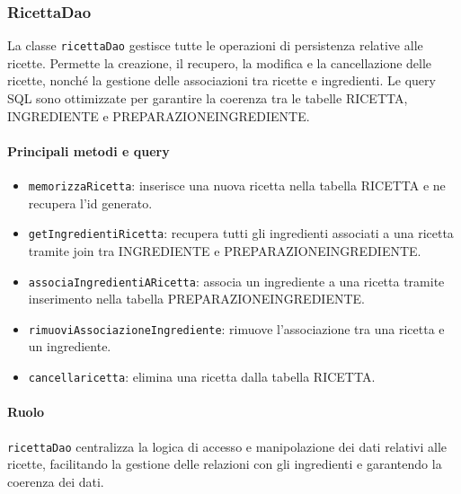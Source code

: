 \subsubsection{RicettaDao}
La classe \texttt{ricettaDao} gestisce tutte le operazioni di persistenza relative alle ricette. Permette la creazione, il recupero, la modifica e la cancellazione delle ricette, nonché la gestione delle associazioni tra ricette e ingredienti. Le query SQL sono ottimizzate per garantire la coerenza tra le tabelle RICETTA, INGREDIENTE e PREPARAZIONEINGREDIENTE.

\paragraph{Principali metodi e query}
\begin{itemize}
    \item \texttt{memorizzaRicetta}: inserisce una nuova ricetta nella tabella RICETTA e ne recupera l'id generato.
    \item \texttt{getIngredientiRicetta}: recupera tutti gli ingredienti associati a una ricetta tramite join tra INGREDIENTE e PREPARAZIONEINGREDIENTE.
    \item \texttt{associaIngredientiARicetta}: associa un ingrediente a una ricetta tramite inserimento nella tabella PREPARAZIONEINGREDIENTE.
    \item \texttt{rimuoviAssociazioneIngrediente}: rimuove l'associazione tra una ricetta e un ingrediente.
    \item \texttt{cancellaricetta}: elimina una ricetta dalla tabella RICETTA.
\end{itemize}

\paragraph{Ruolo}
\texttt{ricettaDao} centralizza la logica di accesso e manipolazione dei dati relativi alle ricette, facilitando la gestione delle relazioni con gli ingredienti e garantendo la coerenza dei dati.

